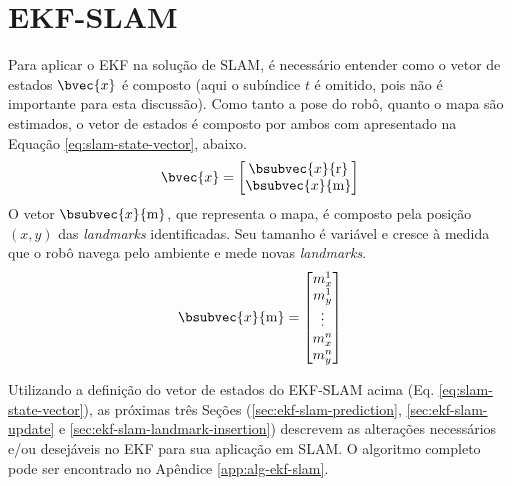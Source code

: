 \section{EKF-SLAM}
Para aplicar o EKF na solução de SLAM, é necessário entender 
como o vetor de estados $\bvec{x}$ é composto (aqui o subíndice $t$ é omitido, pois não é importante para esta discussão). Como tanto a pose do 
robô, quanto o mapa são estimados, o vetor de estados é composto por ambos com apresentado na Equação \ref{eq:slam-state-vector}, abaixo.
\begin{equation}
  \bvec{x} = \begin{bmatrix}
    \bsubvec{x}{\mathrm{r}} \\
    \bsubvec{x}{\mathrm{m}}
  \end{bmatrix}
  \label{eq:slam-state-vector}
\end{equation}
O vetor $\bsubvec{x}{\mathrm{m}}$, que representa o mapa, é composto pela posição $(x, y)$ das \textit{landmarks} identificadas. 
Seu tamanho é variável e cresce à medida que o robô navega pelo ambiente e 
mede novas \textit{landmarks}.
\begin{equation}
  \bsubvec{x}{\mathrm{m}} = \begin{bmatrix}
    m_x^1\\
    m_y^1\\
    \vdots\\
    m_x^n\\
    m_y^n
  \end{bmatrix}
  \label{eq:feature-map}
\end{equation}

Utilizando a definição do vetor de estados do EKF-SLAM acima (Eq. \ref{eq:slam-state-vector}), as próximas três Seções (\ref{sec:ekf-slam-prediction}, \ref{sec:ekf-slam-update} e \ref{sec:ekf-slam-landmark-insertion}) descrevem as alterações necessários e/ou desejáveis no EKF para sua aplicação em SLAM. O algoritmo completo pode ser encontrado no Apêndice \ref{app:alg-ekf-slam}.

